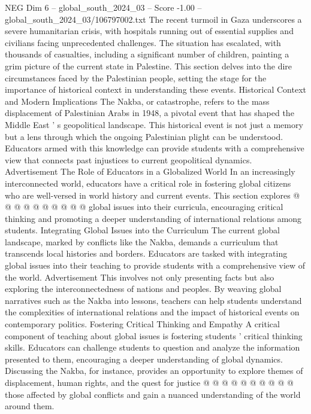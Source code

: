 \begin{textsample}{NEG Dim 6 – global\_south\_2024\_03 – Score -1.00 – global\_south\_2024\_03/106797002.txt}  \label{ex:f6_neg_389}
The recent turmoil in Gaza underscores a severe humanitarian crisis, with hospitals running out of essential supplies and civilians facing unprecedented challenges.
The situation has escalated, with thousands of casualties, including a significant number of children, painting a grim picture of the current state in Palestine.
This section delves into the dire circumstances faced by the Palestinian people, setting the stage for the importance of historical context in understanding these events.
Historical Context and Modern Implications The Nakba, or catastrophe, refers to the mass displacement of Palestinian Arabs in 1948, a pivotal event that has shaped the Middle East ' s geopolitical landscape.
This historical event is not just a memory but a lens through which the ongoing Palestinian plight can be understood.
Educators armed with this knowledge can provide students with a comprehensive view that connects past injustices to current geopolitical dynamics.
Advertisement The Role of Educators in a Globalized World In an increasingly interconnected world, educators have a critical role in fostering global citizens who are well-versed in world history and current events.
This section explores @ @ @ @ @ @ @ @ @ @ global issues into their curricula, encouraging critical thinking and promoting a deeper understanding of international relations among students.
Integrating Global Issues into the Curriculum The current global landscape, marked by conflicts like the Nakba, demands a curriculum that transcends local histories and borders.
Educators are tasked with integrating global issues into their teaching to provide students with a comprehensive view of the world.
Advertisement This involves not only presenting facts but also exploring the interconnectedness of nations and peoples.
By weaving global narratives such as the Nakba into lessons, teachers can help students understand the complexities of international relations and the impact of historical events on contemporary politics.
Fostering Critical Thinking and Empathy A critical component of teaching about global issues is fostering students ' critical thinking skills.
Educators can challenge students to question and analyze the information presented to them, encouraging a deeper understanding of global dynamics.
Discussing the Nakba, for instance, provides an opportunity to explore themes of displacement, human rights, and the quest for justice @ @ @ @ @ @ @ @ @ @ those affected by global conflicts and gain a nuanced understanding of the world around them.

\end{textsample}

